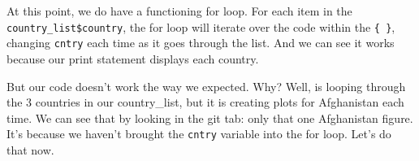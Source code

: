 \documentclass[]{book}
\newenvironment{Shaded}{\begin{snugshade}}{\end{snugshade}}
\newcommand{\KeywordTok}[1]{\textcolor[rgb]{0.13,0.29,0.53}{\textbf{#1}}}
\newcommand{\DataTypeTok}[1]{\textcolor[rgb]{0.13,0.29,0.53}{#1}}
\newcommand{\DecValTok}[1]{\textcolor[rgb]{0.00,0.00,0.81}{#1}}
\newcommand{\StringTok}[1]{\textcolor[rgb]{0.31,0.60,0.02}{#1}}
\newcommand{\ControlFlowTok}[1]{\textcolor[rgb]{0.13,0.29,0.53}{\textbf{#1}}}
\newcommand{\OperatorTok}[1]{\textcolor[rgb]{0.81,0.36,0.00}{\textbf{#1}}}
\newcommand{\NormalTok}[1]{#1}
\theoremstyle{definition}
\theoremstyle{definition}
\theoremstyle{definition}
\theoremstyle{remark}
\begin{document}
\begin{Shaded}
\end{Shaded}

At this point, we do have a functioning for loop. For each item in the
\texttt{country\_list\$country}, the for loop will iterate over the code
within the \texttt{\{\ \}}, changing \texttt{cntry} each time as it goes
through the list. And we can see it works because our print statement
displays each country.

But our code doesn't work the way we expected. Why? Well, is looping
through the 3 countries in our country\_list, but it is creating plots
for Afghanistan each time. We can see that by looking in the git tab:
only that one Afghanistan figure. It's because we haven't brought the
\texttt{cntry} variable into the for loop. Let's do that now.
\end{document}

